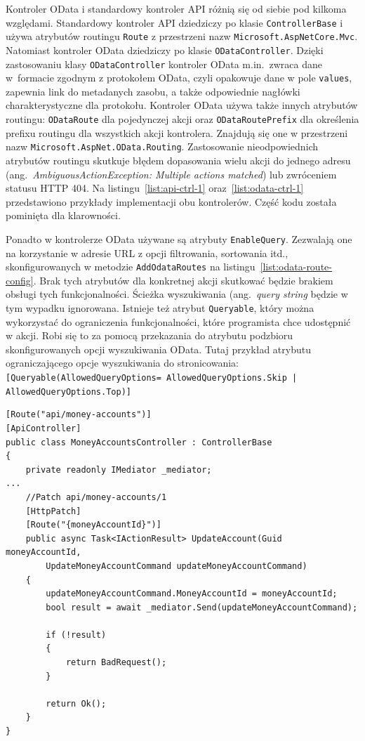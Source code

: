 Kontroler OData i standardowy kontroler API różnią się od siebie pod kilkoma względami. Standardowy kontroler API dziedziczy po klasie \texttt{ControllerBase} i używa atrybutów routingu \texttt{Route} z przestrzeni nazw \texttt{Microsoft.AspNetCore.Mvc}. Natomiast kontroler OData dziedziczy po klasie \texttt{ODataController}. Dzięki zastosowaniu klasy \texttt{ODataController} kontroler OData m.in.\ zwraca dane w~formacie zgodnym z protokołem OData, czyli opakowuje dane w pole \texttt{values}, zapewnia link do metadanych zasobu, a także odpowiednie nagłówki charakterystyczne dla protokołu. Kontroler OData używa także innych atrybutów routingu: \texttt{ODataRoute} dla pojedynczej akcji oraz \texttt{ODataRoutePrefix} dla określenia prefixu routingu dla wszystkich akcji kontrolera. Znajdują się one w przestrzeni nazw \texttt{Microsoft.AspNet.OData.Routing}. Zastosowanie nieodpowiednich atrybutów routingu skutkuje błędem dopasowania wielu akcji do jednego adresu (ang.~\emph{AmbiguousActionException: Multiple actions matched}) lub zwróceniem statusu HTTP 404. Na listingu~\ref{list:api-ctrl-1} oraz~\ref{list:odata-ctrl-1} przedstawiono przykłady implementacji obu kontrolerów. Część kodu została pominięta dla klarowności.

Ponadto w kontrolerze OData używane są atrybuty \texttt{EnableQuery}. Zezwalają one na korzystanie w adresie URL z opcji filtrowania, sortowania itd., skonfigurowanych w metodzie \texttt{AddOdataRoutes} na listingu~\ref{list:odata-route-config}. Brak tych atrybutów dla konkretnej akcji skutkować będzie brakiem obsługi tych funkcjonalności. Ścieżka wyszukiwania (ang.~\emph{query string} będzie w tym wypadku ignorowana. Istnieje też atrybut \texttt{Queryable}, który można wykorzystać do ograniczenia funkcjonalności, które programista chce udostępnić w akcji. Robi się to za pomocą przekazania do atrybutu podzbioru skonfigurowanych opcji wyszukiwania OData. Tutaj przykład atrybutu ograniczającego opcje wyszukiwania do stronicowania: \texttt{[Queryable(AllowedQueryOptions=
    AllowedQueryOptions.Skip | AllowedQueryOptions.Top)]}

{\belowcaptionskip=-10pt
\begin{lstlisting}[label=list:api-ctrl-1,
    caption=Przykład implementacji standardowego kontrolera API]
[Route("api/money-accounts")]
[ApiController]
public class MoneyAccountsController : ControllerBase
{
    private readonly IMediator _mediator;
...
    //Patch api/money-accounts/1
    [HttpPatch]
    [Route("{moneyAccountId}")]
    public async Task<IActionResult> UpdateAccount(Guid moneyAccountId,
        UpdateMoneyAccountCommand updateMoneyAccountCommand)
    {
        updateMoneyAccountCommand.MoneyAccountId = moneyAccountId;
        bool result = await _mediator.Send(updateMoneyAccountCommand);
    
        if (!result)
        {
            return BadRequest();
        }
    
        return Ok();
    }
}
\end{lstlisting}
}

